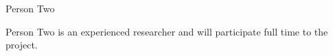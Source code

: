 \begin{participant}[type=R,PM=48,gender=male,salary=5500]{Person Two}

  Person Two is an experienced researcher and will participate full time to the
  project.

\end{participant}

